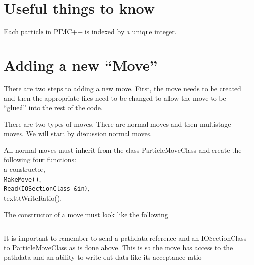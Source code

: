 \documentclass{book}
\begin{document}
\section{Useful things to know}
Each particle in PIMC++ is indexed by a unique integer. 
\section{Adding a new ``Move''}
There are two steps to adding a new move. First, the move needs to be
created and then the appropriate files need to be changed to allow the
move to be ``glued'' into the rest of the code.

There are two types of moves. There are normal moves and then
multistage moves. We will start by discussion normal moves.


All normal moves must inherit from the class ParticleMoveClass and 
create the following four functions: \\
a constructor,\\
\texttt{MakeMove()},\\
\texttt{Read(IOSectionClass \&in)},  \\
texttt{WriteRatio()}.


The constructor of a move must look like the following:\\

\rule{0.6cm}{0cm}

It is important to remember to send a pathdata reference and an
  IOSectionClass to ParticleMoveClass as is done above. This is so the
  move has access to the pathdata and an ability to write out data
  like its acceptance ratio
\end{document}
